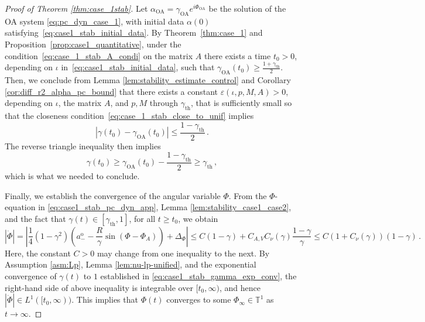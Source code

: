 \documentclass[10pt]{article}
\theoremstyle{definition}
\theoremstyle{definition}
\numberwithin{equation}{section}
\newcommand{\BBT}{\mathbb{T}}
\newcommand{\aOMinus}{a_-^{\text{o}}}
\newcommand{\DPhi}{\Dot{\Phi}}
\newcommand{\gammaTH}{\gamma_{\mathrm{th}}}
\newcommand{\DeltaPhi}{\Delta_{\Phi}}
\newcommand{\PhiA}{\Phi_{A}}
\newcommand{\OA}{\mathrm{OA}}
\begin{document}
\begin{proof}[Proof of Theorem \ref{thm:case_1stab}]
Let $\alpha_{\OA} = \gamma_{\OA} e^{i\Phi_{\OA}}$ be the solution of the OA system \eqref{eq:pc_dyn_case_1}, with initial data $\alpha(0)$ satisfying~\eqref{eq:case1_stab_initial_data}.
By Theorem~\ref{thm:case_1} and Proposition~\ref{prop:case1_quantitative}, under the condition~\eqref{eq:case_1_stab_A_condi} on the matrix $A$
there exists a time $t_0 > 0$, depending on $\iota$ in~\eqref{eq:case1_stab_initial_data}, such that $\gamma_{\OA} (t_0) \geq \frac{1 + \gammaTH}{2}$.
Then, we conclude from Lemma \ref{lem:stability_estimate_control} and Corollary \ref{cor:diff_r2_alpha_pc_bound} that there exists a constant $\varepsilon(\iota, p, M, A) > 0$, depending on $\iota$, the matrix $A$, and $p, M$ through $\gammaTH$, that is sufficiently small so that the closeness condition~\eqref{eq:case_1_stab_close_to_unif} implies
\begin{equation*}
    |\gamma(t_0) - \gamma_{\OA}(t_0)| \leq \frac{1 - \gammaTH}{2} \, .
\end{equation*}
The reverse triangle inequality then implies
\begin{equation*}
\gamma(t_0) \geq \gamma_{\OA} (t_0) - \frac{1 - \gammaTH}{2} \geq \gammaTH \,,
\end{equation*}
which is what we needed to conclude.

Finally, we establish the convergence of the angular variable $\Phi$. 
From the $\Phi$-equation in \eqref{eq:case1_stab_pc_dyn_app}, Lemma \ref{lem:stability_case1_case2}, and the fact that $\gamma(t) \in [\gammaTH, 1]$, for all $t \geq t_0$, we obtain
\begin{equation*}
|\DPhi| = \left| \frac{1}{4} (1 - \gamma^2) \left( \aOMinus - \frac{R}{\gamma} \sin (\Phi - \PhiA) \right) + \DeltaPhi \right| \leq C (1 - \gamma) + C_{A,V} C_{\nu}(\gamma) \frac{1 - \gamma}{\gamma} \leq C \left( 1 + C_{\nu}(\gamma) \right) (1 - \gamma) \, .
\end{equation*}
Here, the constant $C > 0$ may change from one inequality to the next.
By Assumption \ref{asm:Lp}, Lemma \ref{lem:nu-lp-unified}, and the exponential convergence of $\gamma(t)$ to $1$ established in \eqref{eq:case1_stab_gamma_exp_conv}, the right-hand side of above inequality is integrable over $[t_0, \infty)$, and hence $|\DPhi| \in L^1 ([t_0, \infty))$.
This implies that $\Phi(t)$ converges to some $\Phi_{\infty} \in \BBT^1$ as $t \rightarrow \infty$.



\end{proof}
\end{document}
